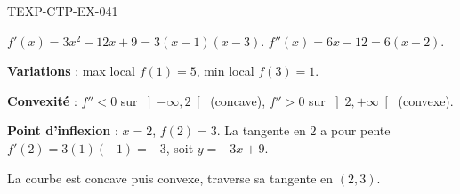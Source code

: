 \begin{corrige}{TEXP-CTP-EX-041}

$f'(x) = 3x^2 - 12x + 9 = 3(x-1)(x-3)$. $f''(x) = 6x - 12 = 6(x-2)$.


\textbf{Variations} : max local $f(1)=5$, min local $f(3)=1$.

\textbf{Convexité} : $f''<0$ sur $\left]-\infty,2\right[$ (concave), $f''>0$ sur $\left]2,+\infty\right[$ (convexe).

\textbf{Point d'inflexion} : $x=2$, $f(2)=3$. La tangente en $2$ a pour pente $f'(2) = 3(1)(-1) = -3$, soit $y = -3x+9$.

La courbe est concave puis convexe, traverse sa tangente en $(2,3)$.

\end{corrige}
